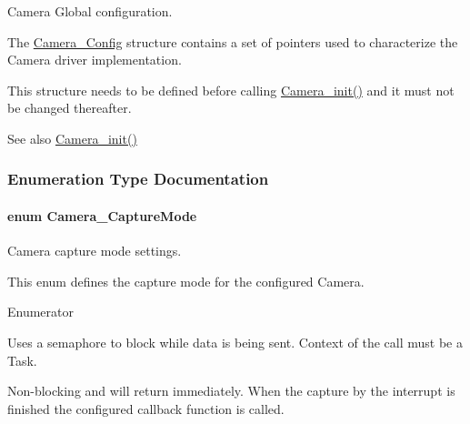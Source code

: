 Camera Global configuration. 

The \hyperlink{struct_camera___config}{Camera\+\_\+\+Config} structure contains a set of pointers used to characterize the Camera driver implementation.

This structure needs to be defined before calling \hyperlink{_camera_8h_ab0208c74b70ac5b50cb26c36f1f3ebad}{Camera\+\_\+init()} and it must not be changed thereafter.

\begin{DoxySeeAlso}{See also}
\hyperlink{_camera_8h_ab0208c74b70ac5b50cb26c36f1f3ebad}{Camera\+\_\+init()} 
\end{DoxySeeAlso}


\subsubsection{Enumeration Type Documentation}
\paragraph[{Camera\+\_\+\+Capture\+Mode}]{\setlength{\rightskip}{0pt plus 5cm}enum {\bf Camera\+\_\+\+Capture\+Mode}}\label{_camera_8h_a74c8a8a13eebddea16c33c726d096ba8}


Camera capture mode settings. 

This enum defines the capture mode for the configured Camera. \begin{Desc}
\item[Enumerator]\par
\begin{description}
\item[{\em 
Camera\+\_\+\+M\+O\+D\+E\+\_\+\+B\+L\+O\+C\+K\+I\+N\+G\label{_camera_8h_a74c8a8a13eebddea16c33c726d096ba8aad6127b321c6b22ffe1a50caee5a4fe1}
}]Uses a semaphore to block while data is being sent. Context of the call must be a Task. \item[{\em 
Camera\+\_\+\+M\+O\+D\+E\+\_\+\+C\+A\+L\+L\+B\+A\+C\+K\label{_camera_8h_a74c8a8a13eebddea16c33c726d096ba8ae2f15a1a358226aa81d59509f5a31191}
}]Non-\/blocking and will return immediately. When the capture by the interrupt is finished the configured callback function is called. \end{description}
\end{Desc}
